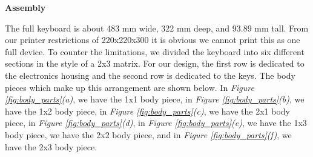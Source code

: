 \textbf{Assembly}

The full keyboard is about 483 mm wide, 322 mm deep, and 93.89 mm tall. From our printer restrictions of 220x220x300 it is obvious we cannot print this as one full device. To counter the limitations, we divided the keyboard into six different sections in the style of a 2x3 matrix. For our design, the first row is dedicated to the electronics housing and the second row is dedicated to the keys. The body pieces which make up this arrangement are shown below. In \textit{Figure \ref{fig:body_parts}(a)}, we have the 1x1 body piece, in \textit{Figure \ref{fig:body_parts}(b)}, we have the 1x2 body piece, in \textit{Figure \ref{fig:body_parts}(c)}, we have the 2x1 body piece, in \textit{Figure \ref{fig:body_parts}(d)}, in \textit{Figure \ref{fig:body_parts}(e)}, we have the 1x3 body piece, we have the 2x2 body piece, and in \textit{Figure \ref{fig:body_parts}(f)}, we have the 2x3 body piece.

